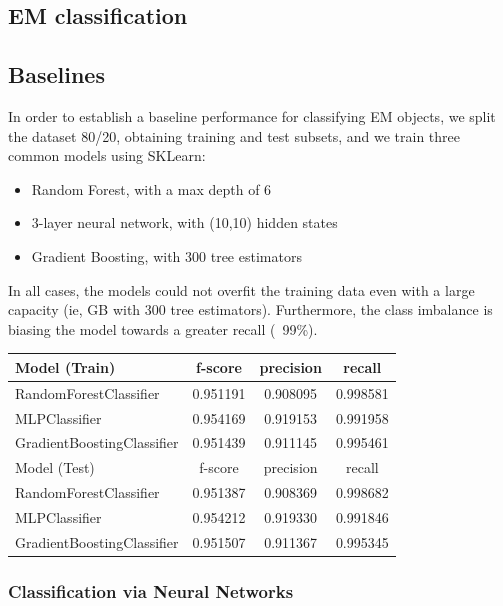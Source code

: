 \documentclass{article}
\begin{document}
\subsection{EM classification}

\subsection{Baselines}
In order to establish a baseline performance for classifying EM objects, we split the dataset 80/20, obtaining training and test subsets, and we train three common models using SKLearn:

\begin{itemize}
    \item Random Forest, with a max depth of 6
    \item 3-layer neural network, with (10,10) hidden states
    \item Gradient Boosting, with 300 tree estimators
\end{itemize}

In all cases, the models could not overfit the training data even with a large capacity (ie, GB with 300 tree estimators). Furthermore, the class imbalance is biasing the model towards a greater recall (~99\%).

\begin{table}
\centering
\begin{tabular}[]{lccc}
    \toprule
     Model (Train) & f-score & precision & recall\\
    \midrule
    RandomForestClassifier &  0.951191 &  0.908095 & 0.998581\\
    MLPClassifier & 0.954169  & 0.919153 & 0.991958\\
    GradientBoostingClassifier  & 0.951439 &  0.911145 & 0.995461\\
    \midrule
     Model (Test) & f-score  & precision  &   recall\\
    \midrule
    RandomForestClassifier &  0.951387 &  0.908369 & 0.998682\\
    MLPClassifier & 0.954212 & 0.919330 & 0.991846\\
    GradientBoostingClassifier & 0.951507 &  0.911367 & 0.995345\\
    \bottomrule
\end{tabular}    
\end{table}


\subsubsection{Classification via Neural Networks}
\end{document}
